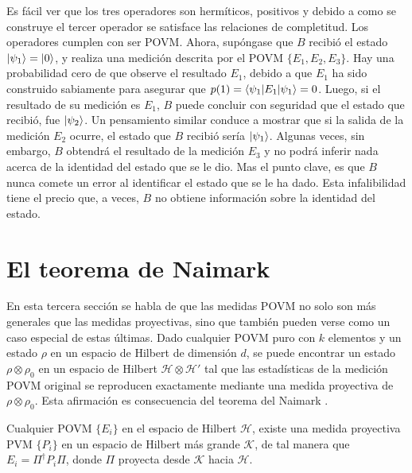 Es fácil ver que los tres operadores son hermíticos, positivos y debido a como
se construye el tercer operador se satisface las relaciones de completitud. Los
operadores cumplen con ser POVM\@. Ahora, supóngase que $B$ recibió el estado
$|\psi_1\rangle=|0\rangle$, y realiza una medición descrita por el POVM
$\{E_1,E_2,E_3\}$. Hay una probabilidad cero de que observe el resultado $E_1$,
debido a que $E_1$ ha sido construido sabiamente para asegurar que
$p(1)=\langle\psi_1|E_1|\psi_1\rangle=0$. Luego, si el resultado de su medición es
$E_1$, $B$ puede concluir con seguridad que el estado que recibió, fue
$|\psi_2\rangle $. Un pensamiento similar conduce a mostrar que si la salida de la
medición $E_2$ ocurre, el estado que $B$ recibió sería $|\psi_1\rangle$. Algunas
veces, sin embargo, $B$ obtendrá el resultado de la medición $E_3$ y no podrá
inferir nada acerca de la identidad del estado que se le dio. Mas el punto
clave, es que $B$ nunca comete un error al identificar el estado que se le ha
dado. Esta infalibilidad tiene el precio que, a veces, $B$ no obtiene
información sobre la identidad del estado.

\section{El teorema de Naimark} %

En esta tercera sección se habla de que las medidas POVM no solo son más
generales que las medidas proyectivas, sino que también pueden verse como un
caso especial de estas últimas. Dado cualquier POVM puro con $k$ elementos y un
estado $\rho$ en un espacio de Hilbert de dimensión $d$, se puede encontrar un
estado $\rho \otimes \rho_0$ en un espacio de Hilbert
$\mathcal{H}\otimes\mathcal{H'}$ tal que las estadísticas de la medición POVM
original se reproducen exactamente mediante una medida proyectiva de $\rho
\otimes \rho_0$. Esta afirmación es consecuencia del teorema del Naimark
{\cite{2007geometry}}.

\begin{theorem} 
Cualquier POVM $\{E_i\}$ en el espacio de Hilbert $\mathcal{H}$, existe una
medida proyectiva PVM $\{P_i\}$ en un espacio de Hilbert más grande
$\mathcal{K}$, de tal manera que $E_i=\Pi^\dagger P_i\Pi$, donde $\Pi$ proyecta
desde $\mathcal{K}$ hacia $\mathcal{H}$.
\end{theorem}
	


